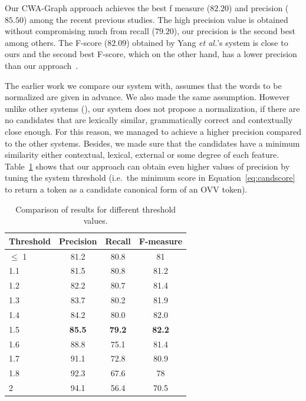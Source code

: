 \documentclass[a4paper,onesided,12pt]{report}
\begin{document}
Our CWA-Graph approach achieves the best f measure ($82.20$) and precision ($85.50$) among the recent previous studies. The high precision value is obtained without compromising much from recall ($79.20$), our precision is the second best among others. The F-score ($82.09$) obtained by Yang \textit{et al.}'s system is close to ours and the second best F-score, which on the other hand, has a lower precision than our approach~\cite{DBLP:conf/emnlp/YangE13}.

The earlier work we compare our system with, assumes that the words to be normalized are given in advance. We also made the same assumption. However unlike other systems (\cite{DBLP:conf/emnlp/YangE13,liu2012broad,Han:2011:LNS:2002472.2002520}), our system does not propose a normalization, if there are no candidates that are lexically similar, grammatically correct and contextually close enough. For this reason, we managed to achieve a higher precision compared to the other systems. Besides, we made sure that the candidates have a minimum similarity either contextual, lexical, external or some degree of each feature. Table~\ref{tab:thresholds} shows that our approach can obtain even higher values of precision by tuning the system threshold (i.e.~the minimum score in Equation~\ref{eq:candscore} to return a token as a candidate canonical form of an OVV token).

\begin{table}[thb]
  \caption{Comparison of results for different threshold values.}
  \centering
  \begin{tabular}[th]{|l|c|c|c|}
    \hline
    \textbf{Threshold} & \textbf{Precision} & \textbf{Recall} & \textbf{F-measure} \\
    \hline
    $\leq$ 1 & 81.2 &	80.8 &	81 \\\hline
    1.1 & 81.5 & 80.8 &	81.2 \\\hline
    1.2 & 82.2 &	80.7 &	81.4 \\\hline
    1.3 & 83.7 &	80.2 &	81.9 \\\hline
    1.4 & 84.2 &	80.0 &	82.0 \\\hline
    1.5 & \textbf{85.5} &  \textbf{79.2} &  \textbf{82.2} \\\hline
    1.6 & 88.8	& 75.1	& 81.4 \\\hline
    1.7	& 91.1	& 72.8	& 80.9 \\\hline
    1.8	& 92.3	& 67.6	& 78 \\\hline
    2	& 94.1	& 56.4	& 70.5 \\
    \hline
  \end{tabular}
\label{tab:thresholds}
\end{table}
\end{document}
